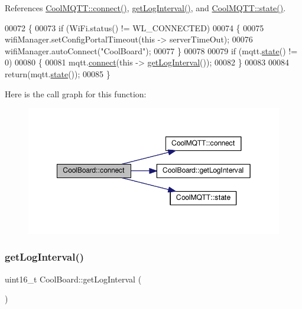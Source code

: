 References \hyperlink{_cool_m_q_t_t_8cpp_source_l00064}{Cool\+M\+Q\+T\+T\+::connect()}, \hyperlink{_cool_board_8cpp_source_l00496}{get\+Log\+Interval()}, and \hyperlink{_cool_m_q_t_t_8cpp_source_l00051}{Cool\+M\+Q\+T\+T\+::state()}.


\begin{DoxyCode}
00072 \{
00073     \textcolor{keywordflow}{if} (WiFi.status() != WL\_CONNECTED)
00074     \{
00075         wifiManager.setConfigPortalTimeout(\textcolor{keyword}{this} -> serverTimeOut);
00076         wifiManager.autoConnect(\textcolor{stringliteral}{"CoolBoard"});
00077     \}
00078 
00079     \textcolor{keywordflow}{if} (mqtt.\hyperlink{class_cool_m_q_t_t_a5d003307eff78efbd585e42b43b72b6d}{state}() != 0)
00080     \{
00081         mqtt.\hyperlink{class_cool_m_q_t_t_a58b0b1f64b269c2681685208262fba1d}{connect}(\textcolor{keyword}{this} -> \hyperlink{class_cool_board_aaa24480b273fc095a1356a589c333781}{getLogInterval}());
00082     \}
00083 
00084     \textcolor{keywordflow}{return}(mqtt.\hyperlink{class_cool_m_q_t_t_a5d003307eff78efbd585e42b43b72b6d}{state}());
00085 \}
\end{DoxyCode}
Here is the call graph for this function\+:
\nopagebreak
\begin{figure}[H]
\begin{center}
\leavevmode
\includegraphics[width=349pt]{class_cool_board_a519de78b807f8ec6463ff484eb925918_cgraph}
\end{center}
\end{figure}
\mbox{\label{class_cool_board_aaa24480b273fc095a1356a589c333781}} 
\subsubsection{\texorpdfstring{get\+Log\+Interval()}{getLogInterval()}}
{\footnotesize\ttfamily uint16\+\_\+t Cool\+Board\+::get\+Log\+Interval (\begin{DoxyParamCaption}{ }\end{DoxyParamCaption})}

